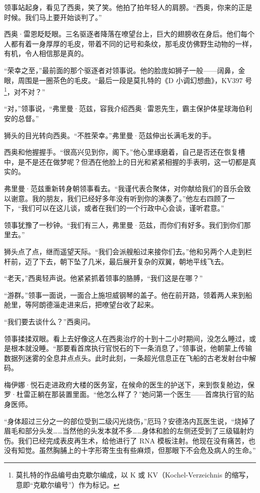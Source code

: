 \documentclass[AutoFakeBold=true]{book}
\begin{document}
领事站起身，看见了西奥，笑了笑。他拍了拍年轻人的肩膀。``西奥，你来的正是时候。我们马上要开始谈判了。''

西奥·雷恩眨眨眼。三名驱逐者降落在嘹望台上，巨大的翅膀收在身后。他们每个人都有着一身厚厚的毛皮，带着不同的记号和条纹，那毛皮仿佛野生动物的一样，有机，令人相信那是真的。

``荣幸之至，''最前面的那个驱逐者对领事说。他的脸庞如狮子一般——阔鼻，金眼，周围是一圈茶色的毛皮。``最后一段是莫扎特的《D 小调幻想曲》，KV397 号\footnote{莫扎特的作品编号由克歇尔编成，以 K 或 KV（Kochel-Verzeichnis 的缩写，意即``克歇尔编号''）作为标记。}，对不对？''

``对，''领事说，``弗里曼·范兹，容我介绍西奥·雷恩先生，霸主保护体星球海伯利安的总督。''

狮头的目光转向西奥。``不胜荣幸。''弗里曼·范兹伸出长满毛发的手。

西奥和他握握手。``很高兴见到你，阁下。''他心里琢磨着，自己是否还在恢复槽中，是不是还在做梦呢？但洒在他脸上的日光和紧紧相握的手表明，这一切都是真实的。

弗里曼·范兹重新转身朝领事看去。``我谨代表合聚体，对你献给我们的音乐会致以谢意。我的朋友，我们已经好多年没有听到你的演奏了。''他左右四顾了一下，``我们可以在这儿谈，或者在我们的一个行政中心会谈，谨听君意。''

领事犹豫了一秒钟。``我们有三人，弗里曼·范兹，而你们有好多。我们到你们那里去。''

狮头点了点，继而遥望天际。``我们会派艘船过来接你们去。''他和另两个人走到栏杆前，迈了下去，朝下坠了几米，最后展开复杂的双翼，朝地平线飞去。

``老天，''西奥轻声说。他紧紧抓着领事的胳膊，``我们这是在哪？''

``游群。''领事一面说，一面合上施坦威钢琴的盖子。他在前开路，领着两人来到船舱里，等阿朗德淄走进来后，把嘹望台收了起来。

``我们要去谈什么？''西奥问。

领事揉揉双眼。看上去好像这人在西奥治疗的十到十二小时期间，没怎么睡过，或是根本就没睡。``那要看首席执行官悦石的下一条消息了，''领事说，他朝蒙上传输数据列迷雾的全息井点点头。此时此刻，一条超光信息正在飞船的古老发射台中解码。

\vspace*{1em}

梅伊娜·悦石走进政府大楼的医务室，在候命的医生的护送下，来到恢复舱边，保罗·杜雷正躺在那装置里面。``他怎么样了？''她问第一个医生——首席执行官的贴身医师。

``身体超过三分之一的部位受到二级闪光烧伤，''厄玛？安德洛内瓦医生说，``烧掉了眉毛和部分头发……当然他的头发本就不多……身体和脸的左侧还受到了三级辐射灼伤。我们已经完成表皮再生术，给他进行了 RNA 模板注射。他现在没有痛苦，也没有知觉。虽然胸脯上的十字形寄生虫有些麻烦，但那眼下不会危及病人的生命。''
\end{document}
